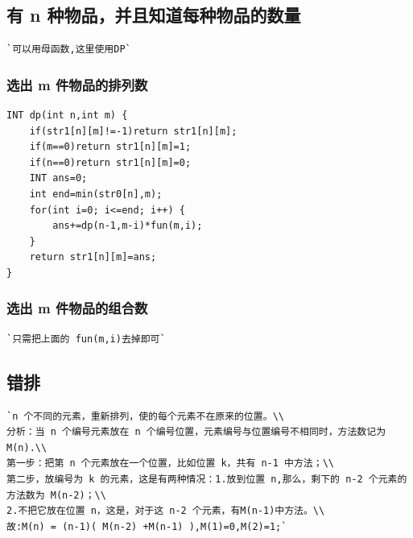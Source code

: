 \documentclass[a4paper]{article}
\begin{document}
\begin{CJK*}{UTF8}{gbsn}
\begin{multicols}{3}
\begin{flushleft}
\subsection{有 n 种物品，并且知道每种物品的数量}
\begin{lstlisting}
`可以用母函数,这里使用DP`
\end{lstlisting}


\subsubsection{选出 m 件物品的排列数}
\begin{lstlisting}
INT dp(int n,int m) {
    if(str1[n][m]!=-1)return str1[n][m];
    if(m==0)return str1[n][m]=1;
    if(n==0)return str1[n][m]=0;
    INT ans=0;
    int end=min(str0[n],m);
    for(int i=0; i<=end; i++) {
        ans+=dp(n-1,m-i)*fun(m,i);
    }
    return str1[n][m]=ans;
}
\end{lstlisting}

\subsubsection{选出 m 件物品的组合数}
\begin{lstlisting}
`只需把上面的 fun(m,i)去掉即可`
\end{lstlisting}



\subsection{错排}
\begin{lstlisting}
`n 个不同的元素，重新排列，使的每个元素不在原来的位置。\\
分析：当 n 个编号元素放在 n 个编号位置，元素编号与位置编号不相同时，方法数记为 M(n).\\
第一步：把第 n 个元素放在一个位置，比如位置 k，共有 n-1 中方法；\\
第二步，放编号为 k 的元素，这是有两种情况：1.放到位置 n,那么，剩下的 n-2 个元素的方法数为 M(n-2)；\\
2.不把它放在位置 n，这是，对于这 n-2 个元素，有M(n-1)中方法。\\
故:M(n) = (n-1)( M(n-2) +M(n-1) ),M(1)=0,M(2)=1;`
\end{lstlisting}


\end{flushleft}
\end{multicols}
\end{CJK*}
\end{document}
